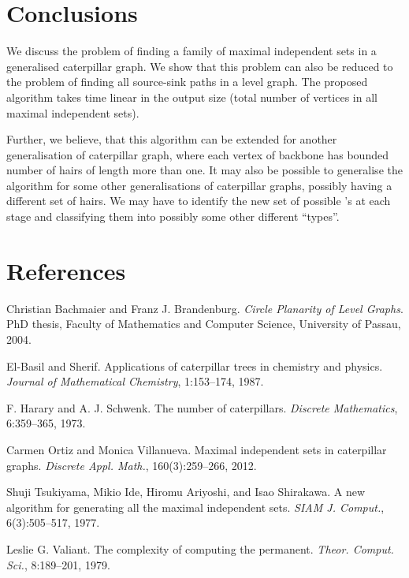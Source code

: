 \documentclass[10pt]{article}
\begin{document}
\section*{Conclusions}

We discuss the problem of finding a family of maximal independent sets in
a generalised caterpillar graph. We show that this problem can also be
reduced to the problem of finding all source-sink paths in a level graph.
The proposed algorithm takes time linear in the output size (total number
of vertices in all maximal independent sets).

Further, we believe, that this algorithm can be extended for another
generalisation of caterpillar graph, where each vertex of backbone has
bounded number of hairs of length more than one. It may also be possible
to generalise the algorithm for some other generalisations of caterpillar
graphs, possibly having a different set of hairs.  We may have to
identify the new set of possible 's at each stage  and
classifying them into possibly some other different ``types''. 

\section*{References}


\noindent [1] Christian Bachmaier and Franz J. Brandenburg. {\em Circle Planarity
of Level Graphs}. PhD thesis, Faculty of Mathematics and Computer
Science, University of Passau, 2004.

\noindent [2] El-Basil and Sherif. Applications of caterpillar trees in chemistry
and physics. {\em Journal of Mathematical Chemistry}, 1:153--174, 1987.

\noindent [3] F. Harary and A. J. Schwenk. The number of caterpillars.  {\em
Discrete Mathematics}, 6:359--365, 1973.

\noindent [4] Carmen Ortiz and Monica Villanueva. Maximal independent sets in
caterpillar graphs. {\em Discrete Appl. Math.}, 160(3):259--266, 2012.

\noindent [5] Shuji Tsukiyama, Mikio Ide, Hiromu Ariyoshi, and Isao Shirakawa. A
new algorithm for generating all the maximal independent sets. {\em SIAM
J. Comput.}, 6(3):505--517, 1977.

\noindent [6] Leslie G. Valiant. The complexity of computing the permanent. {\em
Theor. Comput. Sci.}, 8:189--201, 1979.
\end{document}
